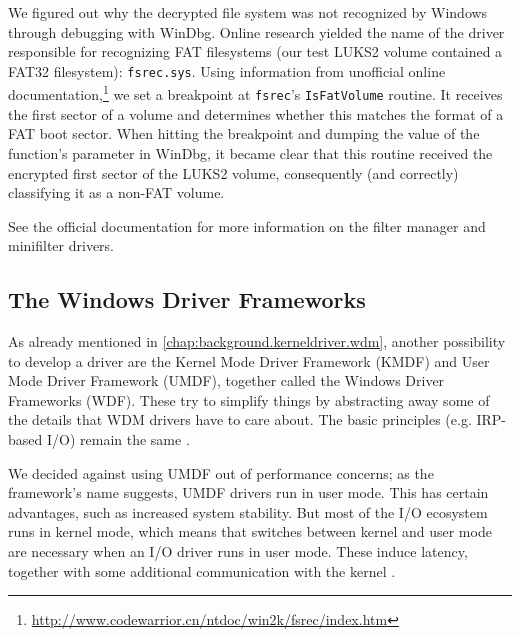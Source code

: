 We figured out why the decrypted file system was not recognized by Windows through debugging with WinDbg. Online research yielded the name of the driver responsible for recognizing FAT filesystems (our test LUKS2 volume contained a FAT32 filesystem): \texttt{fsrec.sys}. Using information from unofficial online documentation,\footnote{\label{fn:ourapproach.rejected.fsrecdoc} \url{http://www.codewarrior.cn/ntdoc/win2k/fsrec/index.htm}} we set a breakpoint at \texttt{fsrec}'s \texttt{IsFatVolume} routine. It receives the first sector of a volume and determines whether this matches the format of a FAT boot sector. When hitting the breakpoint and dumping the value of the function's parameter in WinDbg, it became clear that this routine received the encrypted first sector of the LUKS2 volume, consequently (and correctly) classifying it as a non-FAT volume.

See the official documentation \cite{Fltmgr} for more information on the filter manager and minifilter drivers.
%

\subsection{The Windows Driver Frameworks}
\label{chap:ourapproach.rejected.wdf}
As already mentioned in \autoref{chap:background.kerneldriver.wdm}, another possibility to develop a driver are the Kernel Mode Driver Framework (KMDF) and User Mode Driver Framework (UMDF), together called the Windows Driver Frameworks (WDF). These try to simplify things by abstracting away some of the details that WDM drivers have to care about. The basic principles (e.g. IRP-based I/O) remain the same \cite{Yosifovich2017}.

We decided against using UMDF out of performance concerns; as the framework's name suggests, UMDF drivers run in user mode. This has certain advantages, such as increased system stability. But most of the I/O ecosystem runs in kernel mode, which means that switches between kernel and user mode are necessary when an I/O driver runs in user mode. These induce latency, together with some additional communication with the kernel \cite{Yosifovich2017}.

